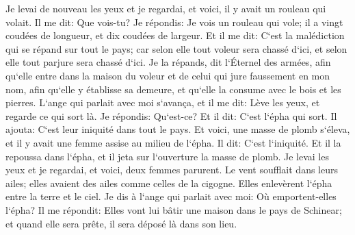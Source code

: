 \verse Je levai de nouveau les yeux et je regardai, et voici, il y avait un rouleau qui volait. 
\verse Il me dit: Que vois-tu? Je répondis: Je vois un rouleau qui vole; il a vingt coudées de longueur, et dix coudées de largeur. 
\verse Et il me dit: C`est la malédiction qui se répand sur tout le pays; car selon elle tout voleur sera chassé d`ici, et selon elle tout parjure sera chassé d`ici. 
\verse Je la répands, dit l`Éternel des armées, afin qu`elle entre dans la maison du voleur et de celui qui jure faussement en mon nom, afin qu`elle y établisse sa demeure, et qu`elle la consume avec le bois et les pierres. 
\verse L`ange qui parlait avec moi s`avança, et il me dit: Lève les yeux, et regarde ce qui sort là. 
\verse Je répondis: Qu`est-ce? Et il dit: C`est l`épha qui sort. Il ajouta: C`est leur iniquité dans tout le pays. 
\verse Et voici, une masse de plomb s`éleva, et il y avait une femme assise au milieu de l`épha. 
\verse Il dit: C`est l`iniquité. Et il la repoussa dans l`épha, et il jeta sur l`ouverture la masse de plomb. 
\verse Je levai les yeux et je regardai, et voici, deux femmes parurent. Le vent soufflait dans leurs ailes; elles avaient des ailes comme celles de la cigogne. Elles enlevèrent l`épha entre la terre et le ciel. 
\verse Je dis à l`ange qui parlait avec moi: Où emportent-elles l`épha? 
\verse Il me répondit: Elles vont lui bâtir une maison dans le pays de Schinear; et quand elle sera prête, il sera déposé là dans son lieu. 

\chapter{}

